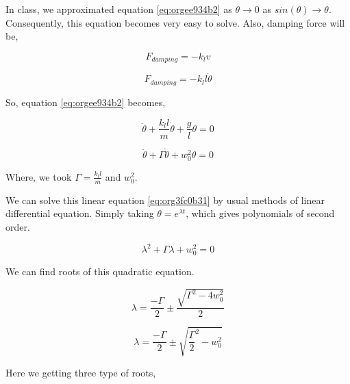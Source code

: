 \documentclass[11pt,a4paper]{article}
\begin{document}
In class, we approximated equation \ref{eq:orgee934b2} as \(\theta \to 0\) as \(sin(\theta) \to \theta\). Consequently, this equation becomes very easy to solve. Also, damping force will be,

\begin{equation*}
\label{eq:org1edbe4c}
F_{damping}=-k_{l}v
\end{equation*}

\begin{equation*}
\label{eq:org57d88bc}
F_{damping}=-k_{l}l\dot{\theta}
\end{equation*}

So, equation \ref{eq:orgee934b2} becomes,

\begin{equation}
\label{eq:org787b214}
\ddot{\theta}+\frac{k_{l}l}{m}\dot{\theta}+\frac{g}{l}\theta=0
\end{equation}

\begin{equation}
\label{eq:org3fc0b31}
\ddot{\theta}+\Gamma\dot{\theta}+w_{0}^{2}\theta=0
\end{equation}

Where, we took \(\Gamma = \frac{k_{l}l}{m}\) and \(w_{0}^{2}\).

We can solve this linear equation \ref{eq:org3fc0b31} by usual methods of linear differential equation. Simply taking \(\theta=e^{\lambda t}\), which gives polynomials of second order.

\begin{equation}
\label{eq:org0d3fbd3}
\lambda^{2}+\Gamma\lambda+w_{0}^{2}=0
\end{equation}

We can find roots of this quadratic equation.

\begin{equation}
\label{eq:orgf26ae96}
\lambda = \frac{-\Gamma}{2} \pm \frac{\sqrt{\Gamma^{2}-4w_{0}^{2}}}{2}
\end{equation}

\begin{equation}
\label{eq:org08026ea}
\lambda = \frac{-\Gamma}{2} \pm \sqrt{\frac{\Gamma}{2}^{2}-w_{0}^{2}}
\end{equation}

Here we getting three type of roots,
\end{document}
